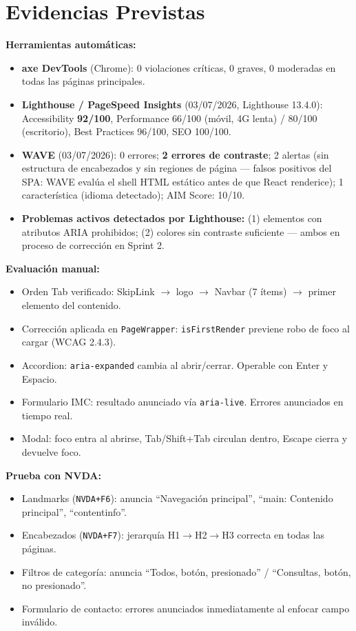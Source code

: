 \documentclass[12pt, a4paper]{article}
\begin{document}
\section{Evidencias Previstas}

\textbf{Herramientas automáticas:}
\begin{itemize}
  \item \textbf{axe DevTools} (Chrome): 0 violaciones críticas, 0 graves, 0 moderadas en todas las páginas principales.
  \item \textbf{Lighthouse / PageSpeed Insights} (03/07/2026, Lighthouse 13.4.0): Accessibility \textbf{92/100}, Performance 66/100 (móvil, 4G lenta) / 80/100 (escritorio), Best Practices 96/100, SEO 100/100.
  \item \textbf{WAVE} (03/07/2026): 0 errores; \textbf{2 errores de contraste}; 2 alertas (sin estructura de encabezados y sin regiones de página --- falsos positivos del SPA: WAVE evalúa el shell HTML estático antes de que React renderice); 1 característica (idioma detectado); AIM Score: 10/10.
  \item \textbf{Problemas activos detectados por Lighthouse:} (1) elementos con atributos ARIA prohibidos; (2) colores sin contraste suficiente --- ambos en proceso de corrección en Sprint 2.
\end{itemize}

\textbf{Evaluación manual:}
\begin{itemize}
  \item Orden Tab verificado: SkipLink $\to$ logo $\to$ Navbar (7 ítems) $\to$ primer elemento del contenido.
  \item Corrección aplicada en \texttt{PageWrapper}: \texttt{isFirstRender} previene robo de foco al cargar (WCAG 2.4.3).
  \item Accordion: \texttt{aria-expanded} cambia al abrir/cerrar. Operable con Enter y Espacio.
  \item Formulario IMC: resultado anunciado vía \texttt{aria-live}. Errores anunciados en tiempo real.
  \item Modal: foco entra al abrirse, Tab/Shift+Tab circulan dentro, Escape cierra y devuelve foco.
\end{itemize}

\textbf{Prueba con NVDA:}
\begin{itemize}
  \item Landmarks (\texttt{NVDA+F6}): anuncia ``Navegación principal'', ``main: Contenido principal'', ``contentinfo''.
  \item Encabezados (\texttt{NVDA+F7}): jerarquía H1$\to$H2$\to$H3 correcta en todas las páginas.
  \item Filtros de categoría: anuncia ``Todos, botón, presionado'' / ``Consultas, botón, no presionado''.
  \item Formulario de contacto: errores anunciados inmediatamente al enfocar campo inválido.
\end{itemize}
\end{document}
